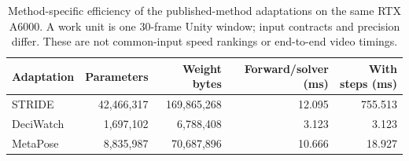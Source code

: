 \begin{table}[htbp]
\centering
\caption{Method-specific efficiency of the published-method adaptations on the same RTX A6000. A work unit is one 30-frame Unity window; input contracts and precision differ. These are not common-input speed rankings or end-to-end video timings.}
\label{tab:external_fusion_efficiency}
\footnotesize
\setlength{\tabcolsep}{3pt}
\begin{tabular}{lrrrr}
\toprule
Adaptation & Parameters & Weight bytes & Forward/solver (ms) & With steps (ms) \\
\midrule
STRIDE~\cite{lal2025stride} & 42,466,317 & 169,865,268 & 12.095 & 755.513 \\
DeciWatch~\cite{zeng2022deciwatch} & 1,697,102 & 6,788,408 & 3.123 & 3.123 \\
MetaPose~\cite{usman2022metapose} & 8,835,987 & 70,687,896 & 10.666 & 18.927 \\
\bottomrule
\end{tabular}
\end{table}
